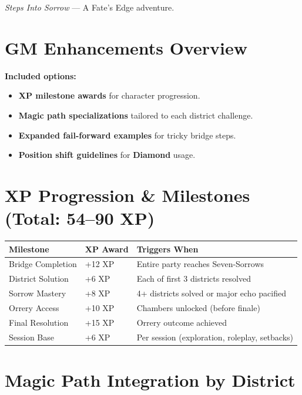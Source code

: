 \documentclass[11pt]{article}
\newcommand{\Term}[1]{\textbf{#1}}
\newcommand{\Diamond}{\Term{Diamond}}
\begin{document}
\vfill
\begin{center}
\small{\emph{Steps Into Sorrow} --- A Fate's Edge adventure.}
\end{center}

\section{GM Enhancements Overview}
\label{app:enhancements}
\textbf{Included options:}
\begin{itemize}
\item \textbf{XP milestone awards} for character progression.
\item \textbf{Magic path specializations} tailored to each district challenge.
\item \textbf{Expanded fail-forward examples} for tricky bridge steps.
\item \textbf{Position shift guidelines} for \Diamond{} usage.
\end{itemize}

\section{XP Progression \& Milestones (Total: 54--90 XP)}
\label{app:xp}
\begin{tabularx}{\linewidth}{@{}l l X@{}}
\toprule
\textbf{Milestone} & \textbf{XP Award} & \textbf{Triggers When}\\
\midrule
Bridge Completion & +12 XP & Entire party reaches Seven-Sorrows\\
District Solution & +6 XP & Each of first 3 districts resolved\\
Sorrow Mastery & +8 XP & 4+ districts solved or major echo pacified\\
Orrery Access & +10 XP & Chambers unlocked (before finale)\\
Final Resolution & +15 XP & Orrery outcome achieved\\
Session Base & +6 XP & Per session (exploration, roleplay, setbacks)\\
\bottomrule
\end{tabularx}

\section{Magic Path Integration by District}
\label{app:magic-by-district}
\end{document}
